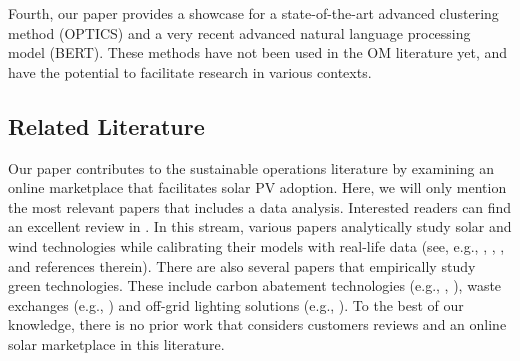 \documentclass[msom,blindrev]{informs3}
\begin{document}
Fourth, our paper provides a showcase for a state-of-the-art advanced clustering method (OPTICS) and a very recent advanced natural language processing model (BERT). These methods have not been used in the OM literature yet, and have the potential to facilitate research in various contexts.

%

%


\subsection{Related Literature} \label{Sec: Lit}

Our paper contributes to the sustainable operations literature by examining an online marketplace that facilitates solar PV adoption. Here, we will only mention the most relevant papers that includes a data analysis. Interested readers can find an excellent review in \cite{HLee}. In this stream, various papers analytically study solar and wind technologies while calibrating their models with real-life data (see, e.g., \cite{alanwolf}, \cite{NJ}, \cite{SunarandBirge}, and references therein). There are also several papers that empirically study green technologies. These include carbon abatement technologies (e.g., \cite{blanco2020carbon}, \cite{Corbett2}), waste exchanges (e.g., \cite{Suvrat}) and  off-grid lighting solutions (e.g., \cite{uppari}).
To the best of our knowledge, there is no prior work that considers customers reviews and an online solar marketplace in this literature.
\end{document}

